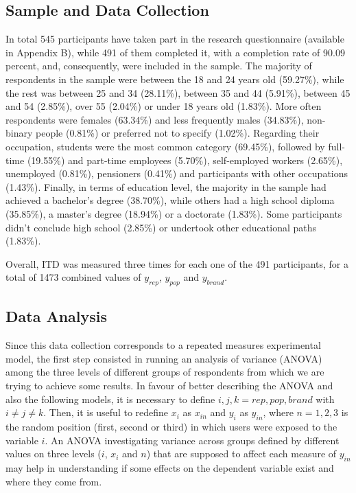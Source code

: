 \subsection{Sample and Data Collection}
In total 545 participants have taken part in the research questionnaire (available in Appendix B), while 491 of them completed it, with a completion rate of 90.09 percent, and, consequently, were included in the sample. The majority of respondents in the sample were between the 18 and 24 years old (59.27\%), while the rest was between 25 and 34 (28.11\%), between 35 and 44 (5.91\%), between 45 and 54 (2.85\%), over 55 (2.04\%) or under 18 years old (1.83\%). More often respondents were females (63.34\%) and less frequently males (34.83\%), non-binary people (0.81\%) or preferred not to specify (1.02\%). Regarding their occupation, students were the most common category (69.45\%), followed by full-time (19.55\%) and part-time employees (5.70\%), self-employed workers (2.65\%), unemployed (0.81\%), pensioners (0.41\%) and participants with other occupations (1.43\%). Finally, in terms of education level, the majority in the sample had achieved a bachelor's degree (38.70\%), while others had a high school diploma (35.85\%), a master's degree (18.94\%) or a doctorate (1.83\%). Some participants didn't conclude high school (2.85\%) or undertook other educational paths (1.83\%).

Overall, ITD was measured three times for each one of the 491 participants, for a total of 1473 combined values of $y_{rep}$, $y_{pop}$ and $y_{brand}$.

\subsection{Data Analysis}
Since this data collection corresponds to a repeated measures experimental model, the first step consisted in running an analysis of variance (ANOVA) among the three levels of different groups of respondents from which we are trying to achieve some results. In favour of better describing the ANOVA and also the following models, it is necessary to define $i, j, k = rep, pop, brand$ with $i \ne j \ne k$. Then, it is useful to redefine $x_i$ as $x_{in}$ and $y_i$ as $y_{in}$, where $n = 1, 2, 3$ is the random position (first, second or third) in which users were exposed to the variable $i$. An ANOVA investigating variance across groups defined by different values on three levels ($i$, $x_i$ and $n$) that are supposed to affect each measure of $y_{in}$ may help in understanding if some effects on the dependent variable exist and where they come from.

